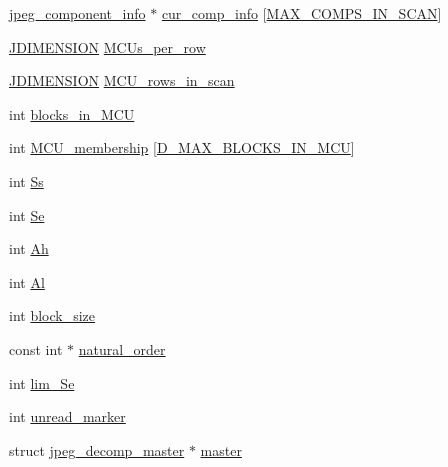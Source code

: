 \begin{DoxyCompactItemize}
\mbox{\hyperlink{structjpeg__component__info}{jpeg\+\_\+component\+\_\+info}} $\ast$ \mbox{\hyperlink{structjpeg__decompress__struct_ab640afe8fb70108caed0c2520aab0c2a}{cur\+\_\+comp\+\_\+info}} \mbox{[}\mbox{\hyperlink{jpeglib_8h_adc7013da016c19051dc623fb3d8b35b4}{M\+A\+X\+\_\+\+C\+O\+M\+P\+S\+\_\+\+I\+N\+\_\+\+S\+C\+AN}}\mbox{]}
\item 
\mbox{\hyperlink{jmorecfg_8h_a04ed4674f6f1d0d50ec241531e38274f}{J\+D\+I\+M\+E\+N\+S\+I\+ON}} \mbox{\hyperlink{structjpeg__decompress__struct_aafebfaa0046cc8b449ce2401c174697f}{M\+C\+Us\+\_\+per\+\_\+row}}
\item 
\mbox{\hyperlink{jmorecfg_8h_a04ed4674f6f1d0d50ec241531e38274f}{J\+D\+I\+M\+E\+N\+S\+I\+ON}} \mbox{\hyperlink{structjpeg__decompress__struct_a6d1110064a4f2fbc46a8831fd148bca6}{M\+C\+U\+\_\+rows\+\_\+in\+\_\+scan}}
\item 
int \mbox{\hyperlink{structjpeg__decompress__struct_a76d2872b589796cb8d66428e660e37fb}{blocks\+\_\+in\+\_\+\+M\+CU}}
\item 
int \mbox{\hyperlink{structjpeg__decompress__struct_abcd46ef2fd7c068bdbdcde43efbd786e}{M\+C\+U\+\_\+membership}} \mbox{[}\mbox{\hyperlink{jpeglib_8h_af974a668decc270fb4d00587618dd110}{D\+\_\+\+M\+A\+X\+\_\+\+B\+L\+O\+C\+K\+S\+\_\+\+I\+N\+\_\+\+M\+CU}}\mbox{]}
\item 
int \mbox{\hyperlink{structjpeg__decompress__struct_a61133b3e8959b3ab4ead2b6e12761176}{Ss}}
\item 
int \mbox{\hyperlink{structjpeg__decompress__struct_a978242a8eb6c75dbb86e8382470b2290}{Se}}
\item 
int \mbox{\hyperlink{structjpeg__decompress__struct_a2df559c55319d0c785b91e95960bea55}{Ah}}
\item 
int \mbox{\hyperlink{structjpeg__decompress__struct_a1dfbdcc8449dbc329a352a75d4046154}{Al}}
\item 
int \mbox{\hyperlink{structjpeg__decompress__struct_a18f5caeead3dbaf5dfebf7aa08e3ee3f}{block\+\_\+size}}
\item 
const int $\ast$ \mbox{\hyperlink{structjpeg__decompress__struct_a45b7a03343d61800942cee3001f73bdb}{natural\+\_\+order}}
\item 
int \mbox{\hyperlink{structjpeg__decompress__struct_acd2e6ff14b5a6109ae04baf754dd5965}{lim\+\_\+\+Se}}
\item 
int \mbox{\hyperlink{structjpeg__decompress__struct_a9a030e86e1bfd0a72c520e1d18b5eef9}{unread\+\_\+marker}}
\item 
struct \mbox{\hyperlink{structjpeg__decomp__master}{jpeg\+\_\+decomp\+\_\+master}} $\ast$ \mbox{\hyperlink{structjpeg__decompress__struct_ace69c5c5534a5de5b54d9c4dcd224fe6}{master}}

\end{DoxyCompactItemize}
